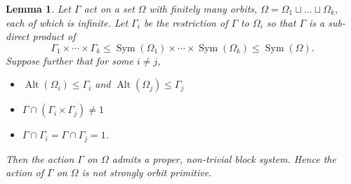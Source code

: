 \documentclass[11pt,a4paper]{amsart}
\newtheorem{lemma}[theorem]{Lemma}
\theoremstyle{definition}
\theoremstyle{remark}
\newcommand{\Sym}{\operatorname{Sym}}
\newcommand{\Alt}{\operatorname{Alt}}
\begin{document}
\begin{lemma}
	\label{non trivial block system}
	Let $\Gamma$ act on a set $\Omega$ with finitely many orbits, $\Omega= \Omega_1 \sqcup \ldots \sqcup \Omega_k$, each of which is infinite. Let $\Gamma_i$ be the restriction of $\Gamma$ to $\Omega_i$ so that $\Gamma$ is a sub-direct product of
	$$
	\Gamma_1 \times \cdots \times \Gamma_k \leq  \Sym(\Omega_1) \times \cdots \times \Sym(\Omega_k) \leq \Sym(\Omega).
	$$
	Suppose further that for some $ i \neq j$, 
	\begin{itemize}
		\item $\Alt(\Omega_i) \leq \Gamma_i$ and $\Alt(\Omega_j) \leq \Gamma_j$
		\item $\Gamma \cap (\Gamma_i \times \Gamma_j) \neq 1$
		\item $\Gamma \cap \Gamma_i = \Gamma \cap \Gamma_j = 1$.
	\end{itemize}
	Then the action $\Gamma$ on $\Omega$ admits a proper, non-trivial block system. Hence the action of $\Gamma$ on $\Omega$ is not strongly orbit primitive. 
\end{lemma}
\end{document}
